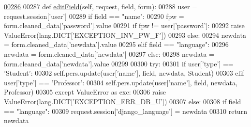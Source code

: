 \begin{DoxyCode}
\hypertarget{classProfile_1_1ProfileUnit_1_1BusProfile_l00286}{}\hyperlink{classProfile_1_1ProfileUnit_1_1BusProfile_a5c116d007081ffefcc1c45cd34c88e10}{00286} 
00287     \textcolor{keyword}{def }\hyperlink{classProfile_1_1ProfileUnit_1_1BusProfile_a5c116d007081ffefcc1c45cd34c88e10}{editField}(self, request, field, form):
00288         user = request.session[\textcolor{stringliteral}{'user'}]
00289         \textcolor{keywordflow}{if} field == \textcolor{stringliteral}{"name"}:
00290             fpw = form.cleaned\_data[\textcolor{stringliteral}{'password'}].value
00291             \textcolor{keywordflow}{if} fpw != user[\textcolor{stringliteral}{'password'}]:
00292                 \textcolor{keywordflow}{raise} ValueError(lang.DICT[\textcolor{stringliteral}{'EXCEPTION\_INV\_PW\_F'}])
00293             \textcolor{keywordflow}{else}:
00294                 newdata = form.cleaned\_data[\textcolor{stringliteral}{'newdata'}].value
00295         \textcolor{keywordflow}{elif} field == \textcolor{stringliteral}{"language"}:
00296             newdata = form.cleaned\_data[\textcolor{stringliteral}{'newdata'}]
00297         \textcolor{keywordflow}{else}:
00298             newdata = form.cleaned\_data[\textcolor{stringliteral}{'newdata'}].value
00299 
00300         \textcolor{keywordflow}{try}:
00301             \textcolor{keywordflow}{if} user[\textcolor{stringliteral}{'type'}] == \textcolor{stringliteral}{'Student'}:
00302                 self.pers.update(user[\textcolor{stringliteral}{'name'}], field, newdata, Student)
00303             \textcolor{keywordflow}{elif} user[\textcolor{stringliteral}{'type'}] == \textcolor{stringliteral}{'Professor'}:
00304                 self.pers.update(user[\textcolor{stringliteral}{'name'}], field, newdata, Professor)
00305         \textcolor{keywordflow}{except} ValueError \textcolor{keyword}{as} exc:
00306             \textcolor{keywordflow}{raise} ValueError(lang.DICT[\textcolor{stringliteral}{'EXCEPTION\_ERR\_DB\_U'}])
00307         \textcolor{keywordflow}{else}:
00308             \textcolor{keywordflow}{if} field == \textcolor{stringliteral}{"language"}:
00309                 request.session[\textcolor{stringliteral}{'django\_language'}] = newdata
00310         \textcolor{keywordflow}{return} newdata

\end{DoxyCode}
